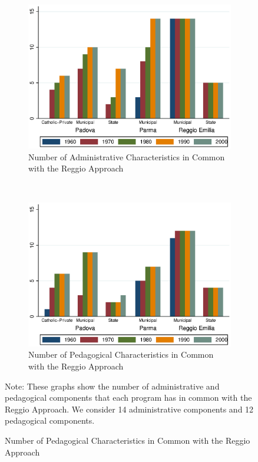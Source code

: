 \begin{figure}[H]
\begin{center}
\begin{subfigure}[b]{0.55\textwidth}
	\caption{Number of Administrative Characteristics in Common with the Reggio Approach}\label{fig:agg-admin}
	\includegraphics[width=\textwidth]{../../output/aggregateAdministrative.eps}
\end{subfigure}%
~
\begin{subfigure}[b]{0.55\textwidth}
	\caption{Number of Pedagogical Characteristics in Common with the Reggio Approach}\label{fig:agg-ped}
	\includegraphics[width=\textwidth]{../../output/aggregatePedagogical.eps}
\end{subfigure}%
\end{center}
\raggedright \footnotesize Note: These graphs show the number of administrative and pedagogical components that each program has in common with the Reggio Approach. We consider 14 administrative components and 12 pedagogical components. 
\end{figure}

